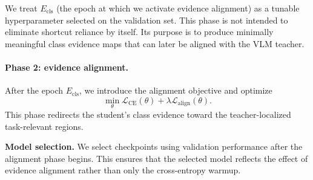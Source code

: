 We treat $E_{\mathrm{cls}}$ (the epoch at which we activate evidence alignment) as a tunable hyperparameter selected on the validation set. This phase is not intended to eliminate shortcut reliance by itself. Its purpose is to produce minimally meaningful class evidence maps that can later be aligned with the VLM teacher.

\paragraph{Phase 2: evidence alignment.}
After the epoch $E_{\mathrm{cls}}$, we introduce the alignment objective and optimize
\begin{equation}
\min_{\theta}
\mathcal{L}_{\mathrm{CE}}(\theta)
+
\lambda \mathcal{L}_{\mathrm{align}}(\theta).
\end{equation}
This phase redirects the student's class evidence toward the teacher-localized task-relevant regions.

\textbf{Model selection.} We select checkpoints using validation performance after the alignment phase begins. This ensures that the selected model reflects the effect of evidence alignment rather than only the cross-entropy warmup. %



